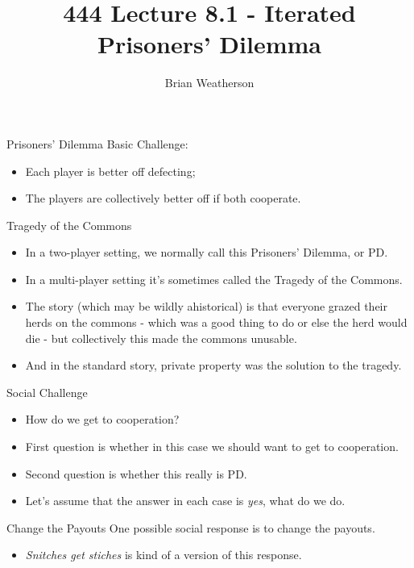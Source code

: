 \documentclass[
  ignorenonframetext,
]{beamer}
\title{444 Lecture 8.1 - Iterated Prisoners' Dilemma}
\author{Brian Weatherson}
\date{}
\providecommand{\tightlist}{%
  \setlength{\itemsep}{0pt}\setlength{\parskip}{0pt}}
\begin{document}
\frame{\titlepage}

\begin{frame}{Prisoners' Dilemma}
\protect\hypertarget{prisoners-dilemma}{}
Basic Challenge:

\begin{itemize}
\tightlist
\item
  Each player is better off defecting;
\item
  The players are collectively better off if both cooperate.
\end{itemize}
\end{frame}

\begin{frame}{Tragedy of the Commons}
\protect\hypertarget{tragedy-of-the-commons}{}
\begin{itemize}
\tightlist
\item
  In a two-player setting, we normally call this Prisoners' Dilemma, or
  PD.
\item
  In a multi-player setting it's sometimes called the Tragedy of the
  Commons.
\item
  The story (which may be wildly ahistorical) is that everyone grazed
  their herds on the commons - which was a good thing to do or else the
  herd would die - but collectively this made the commons unusable.
\item
  And in the standard story, private property was the solution to the
  tragedy.
\end{itemize}
\end{frame}

\begin{frame}{Social Challenge}
\protect\hypertarget{social-challenge}{}
\begin{itemize}[<+->]
\tightlist
\item
  How do we get to cooperation?
\item
  First question is whether in this case we should want to get to
  cooperation.
\item
  Second question is whether this really is PD.
\item
  Let's assume that the answer in each case is \emph{yes}, what do we
  do.
\end{itemize}
\end{frame}

\begin{frame}{Change the Payouts}
\protect\hypertarget{change-the-payouts}{}
One possible social response is to change the payouts.

\begin{itemize}
\tightlist
\item
  \emph{Snitches get stiches} is kind of a version of this response.
\end{itemize}
\end{frame}
\end{document}
